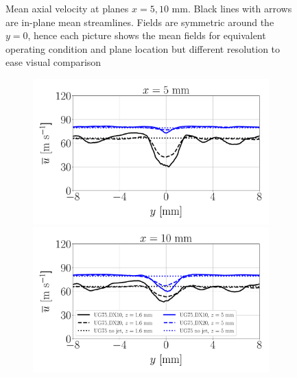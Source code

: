 \begin{figure}[ht]
\centering
\caption[Mean axial velocity at planes $x = 5, 10$ mm]{Mean axial velocity at planes $x = 5, 10$ mm. Black lines with arrows are in-plane mean streamlines. Fields are symmetric around the $y = 0$, hence each picture shows the mean fields for equivalent operating condition and plane location but different resolution to ease visual comparison}
\label{fig:JICF_turbulent_structures_planes_x}
\end{figure}

\clearpage


\begin{figure}[ht]
\centering
\begin{subfigure}[b]{1.0\textwidth}
	\centering
   \includegraphics[scale=0.24]{./part2_developments/figures_ch5_resolved_JICF/turbulent_structures/lines_iso-x_along_y_ux_mean_UG75_x05}
   \includegraphics[scale=0.24]{./part2_developments/figures_ch5_resolved_JICF/turbulent_structures/lines_iso-x_along_y_ux_mean_UG75_x10}

\end{subfigure}
\end{figure}
